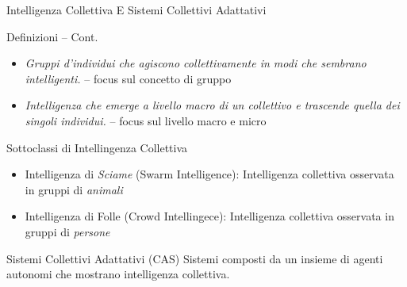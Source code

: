 \documentclass[presentation, 10pt,aspectratio=169]{beamer}\mode<presentation>{\usetheme{AMSBolognaFC}}
\begin{document}
\begin{frame}{Intelligenza Collettiva E Sistemi Collettivi Adattativi}
	\begin{alertblock}{Definizioni -- Cont.}
		\begin{itemize}
			\item \emph{Gruppi d'individui che agiscono collettivamente in modi che sembrano intelligenti.} -- focus sul concetto di \alert{gruppo}
			\item \emph{Intelligenza che emerge a livello macro di un collettivo e trascende quella dei singoli individui.} -- focus sul livello \alert{macro} e \alert{micro}
		\end{itemize}
	\end{alertblock}
	\begin{exampleblock}{Sottoclassi di Intellingenza Collettiva}
		\begin{itemize}
			\item Intelligenza di \emph{Sciame} (\alert{Swarm Intelligence}): Intelligenza collettiva osservata in gruppi di \emph{animali}
			\item Intelligenza di Folle (\alert{Crowd Intellingece}): Intelligenza collettiva osservata in gruppi di \emph {persone}
		\end{itemize}
	\end{exampleblock}
	\begin{block}{Sistemi Collettivi Adattativi (CAS)}
		Sistemi composti da un insieme di agenti autonomi che mostrano intelligenza collettiva.
	\end{block}
\end{frame}
\end{document}
